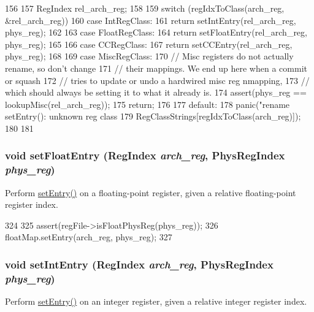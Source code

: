 \begin{DoxyCode}
156 {
157     RegIndex rel_arch_reg;
158 
159     switch (regIdxToClass(arch_reg, &rel_arch_reg)) {
160       case IntRegClass:
161         return setIntEntry(rel_arch_reg, phys_reg);
162 
163       case FloatRegClass:
164         return setFloatEntry(rel_arch_reg, phys_reg);
165 
166       case CCRegClass:
167         return setCCEntry(rel_arch_reg, phys_reg);
168 
169       case MiscRegClass:
170         // Misc registers do not actually rename, so don't change
171         // their mappings.  We end up here when a commit or squash
172         // tries to update or undo a hardwired misc reg nmapping,
173         // which should always be setting it to what it already is.
174         assert(phys_reg == lookupMisc(rel_arch_reg));
175         return;
176 
177       default:
178         panic("rename setEntry(): unknown reg class %
179               RegClassStrings[regIdxToClass(arch_reg)]);
180     }
181 }
\end{DoxyCode}
\hypertarget{classUnifiedRenameMap_a86eefa45c1ed5ce515d2e8911b3d5a9a}{
\subsubsection[{setFloatEntry}]{\setlength{\rightskip}{0pt plus 5cm}void setFloatEntry ({\bf RegIndex} {\em arch\_\-reg}, \/  {\bf PhysRegIndex} {\em phys\_\-reg})}}
\label{classUnifiedRenameMap_a86eefa45c1ed5ce515d2e8911b3d5a9a}
Perform \hyperlink{classUnifiedRenameMap_a5c6cad04be83122ff38650d859fbf1d8}{setEntry()} on a floating-\/point register, given a relative floating-\/point register index. 


\begin{DoxyCode}
324     {
325         assert(regFile->isFloatPhysReg(phys_reg));
326         floatMap.setEntry(arch_reg, phys_reg);
327     }
\end{DoxyCode}
\hypertarget{classUnifiedRenameMap_a1bd71f7635e3eba4028ce0e9e5f88552}{
\subsubsection[{setIntEntry}]{\setlength{\rightskip}{0pt plus 5cm}void setIntEntry ({\bf RegIndex} {\em arch\_\-reg}, \/  {\bf PhysRegIndex} {\em phys\_\-reg})}}
\label{classUnifiedRenameMap_a1bd71f7635e3eba4028ce0e9e5f88552}
Perform \hyperlink{classUnifiedRenameMap_a5c6cad04be83122ff38650d859fbf1d8}{setEntry()} on an integer register, given a relative integer register index. 


